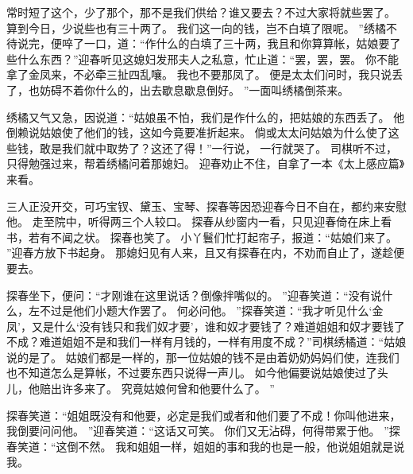 常时短了这个，少了那个，那不是我们供给？谁又要去？不过大家将就些罢了。
算到今日，少说些也有三十两了。
我们这一向的钱，岂不白填了限呢。
”绣橘不待说完，便啐了一口，道：“作什么的白填了三十两，我且和你算算帐，姑娘要了些什么东西？”迎春听见这媳妇发邢夫人之私意，忙止道：“罢，罢，罢。
你不能拿了金凤来，不必牵三扯四乱嚷。
我也不要那凤了。
便是太太们问时，我只说丢了，也妨碍不着你什么的，出去歇息歇息倒好。
”一面叫绣橘倒茶来。
\par
绣橘又气又急，因说道：“姑娘虽不怕，我们是作什么的，把姑娘的东西丢了。
他倒赖说姑娘使了他们的钱，这如今竟要准折起来。
倘或太太问姑娘为什么使了这些钱，敢是我们就中取势了？这还了得！”一行说，
一行就哭了。
司棋听不过，只得勉强过来，帮着绣橘问着那媳妇。
迎春劝止不住，自拿了一本《太上感应篇》来看。
\par
三人正没开交，可巧宝钗、黛玉、宝琴、探春等因恐迎春今日不自在，都约来安慰他。
走至院中，听得两三个人较口。
探春从纱窗内一看，只见迎春倚在床上看书，若有不闻之状。
探春也笑了。
小丫鬟们忙打起帘子，报道：“姑娘们来了。
”迎春方放下书起身。
那媳妇见有人来，且又有探春在内，不劝而自止了，遂趁便要去。
\par
探春坐下，便问：“才刚谁在这里说话？倒像拌嘴似的。
”迎春笑道：“没有说什么，左不过是他们小题大作罢了。
何必问他。
”探春笑道：“我才听见什么‘金凤’，又是什么‘没有钱只和我们奴才要’，谁和奴才要钱了？难道姐姐和奴才要钱了不成？难道姐姐不是和我们一样有月钱的，一样有用度不成？”司棋绣橘道：“姑娘说的是了。
姑娘们都是一样的，那一位姑娘的钱不是由着奶奶妈妈们使，连我们也不知道怎么是算帐，不过要东西只说得一声儿。
如今他偏要说姑娘使过了头儿，他赔出许多来了。
究竟姑娘何曾和他要什么了。
”
\par
探春笑道：“姐姐既没有和他要，必定是我们或者和他们要了不成！你叫他进来，我倒要问问他。
”迎春笑道：“这话又可笑。
你们又无沾碍，何得带累于他。
”探春笑道：“这倒不然。
我和姐姐一样，姐姐的事和我的也是一般，他说姐姐就是说我。

